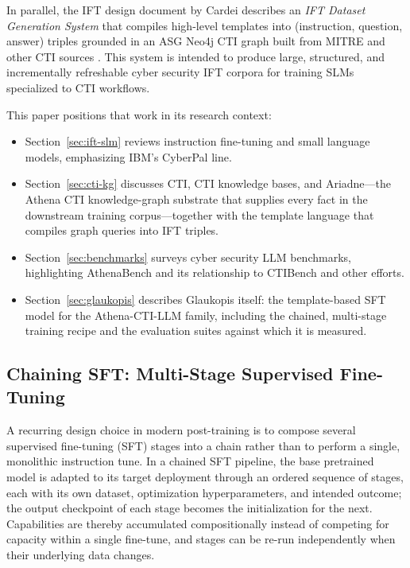 \documentclass[unnumsec,webpdf,contemporary,large]{oup-authoring-template}
\theoremstyle{thmstyleone}
\theoremstyle{thmstyletwo}
\theoremstyle{thmstylethree}
\begin{document}
In parallel, the IFT design document by Cardei describes an \emph{IFT Dataset Generation System} that compiles high-level templates into (instruction, question, answer) triples grounded in an ASG Neo4j CTI graph built from MITRE and other CTI sources \cite{cardei2025ift}. This system is intended to produce large, structured, and incrementally refreshable cyber security IFT corpora for training SLMs specialized to CTI workflows.

This paper positions that work in its research context:
\begin{itemize}
  \item Section~\ref{sec:ift-slm} reviews instruction fine-tuning and small language models, emphasizing IBM's CyberPal line.
  \item Section~\ref{sec:cti-kg} discusses CTI, CTI knowledge bases, and Ariadne---the Athena CTI knowledge-graph substrate that supplies every fact in the downstream training corpus---together with the template language that compiles graph queries into IFT triples.
  \item Section~\ref{sec:benchmarks} surveys cyber security LLM benchmarks, highlighting AthenaBench and its relationship to CTIBench and other efforts.
  \item Section~\ref{sec:glaukopis} describes Glaukopis itself: the template-based SFT model for the Athena-CTI-LLM family, including the chained, multi-stage training recipe and the evaluation suites against which it is measured.
\end{itemize}

\subsection{Chaining SFT: Multi-Stage Supervised Fine-Tuning}
\label{sec:intro-chained-sft}

A recurring design choice in modern post-training is to compose several supervised fine-tuning (SFT) stages into a chain rather than to perform a single, monolithic instruction tune. In a chained SFT pipeline, the base pretrained model is adapted to its target deployment through an ordered sequence of stages, each with its own dataset, optimization hyperparameters, and intended outcome; the output checkpoint of each stage becomes the initialization for the next. Capabilities are thereby accumulated compositionally instead of competing for capacity within a single fine-tune, and stages can be re-run independently when their underlying data changes.
\end{document}
